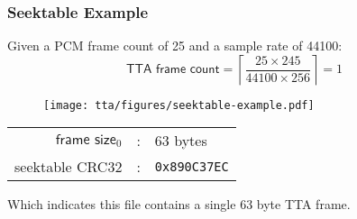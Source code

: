 \subsubsection{Seektable Example}
Given a PCM frame count of 25 and a sample rate of 44100:
\begin{equation*}
\textsf{TTA frame count} = \left\lceil\frac{25 \times 245}{44100 \times 256}\right\rceil = 1
\end{equation*}
\begin{figure}[h]
  \texttt{[image: tta/figures/seektable-example.pdf]}
\end{figure}
\begin{table}[h]
  \begin{tabular}{rcl}
    $\textsf{frame size}_0$ & : & 63 bytes \\
    \textsf{seektable CRC32} & : & \texttt{0x890C37EC} \\
  \end{tabular}
\end{table}
\par
\noindent
Which indicates this file contains a single 63 byte TTA frame.

\clearpage


